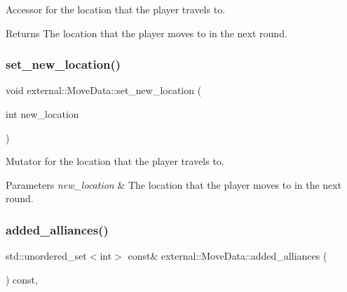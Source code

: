 Accessor for the location that the player travels to. 

\begin{DoxyReturn}{Returns}
The location that the player moves to in the next round. 
\end{DoxyReturn}
\mbox{\label{classexternal_1_1_move_data_a81e78c6507a8cb0be615b23e9c94b7f4}} 
\subsubsection{\texorpdfstring{set\+\_\+new\+\_\+location()}{set\_new\_location()}}
{\footnotesize\ttfamily void external\+::\+Move\+Data\+::set\+\_\+new\+\_\+location (\begin{DoxyParamCaption}\item[{int}]{new\+\_\+location }\end{DoxyParamCaption})\hspace{0.3cm}{\ttfamily [inline]}}



Mutator for the location that the player travels to. 


\begin{DoxyParams}{Parameters}
{\em new\+\_\+location} & The location that the player moves to in the next round. \\
\hline
\end{DoxyParams}
\mbox{\label{classexternal_1_1_move_data_a0bcb09d49ed392fb21395d6182d63f26}} 
\subsubsection{\texorpdfstring{added\+\_\+alliances()}{added\_alliances()}}
{\footnotesize\ttfamily std\+::unordered\+\_\+set$<$int$>$ const\& external\+::\+Move\+Data\+::added\+\_\+alliances (\begin{DoxyParamCaption}{ }\end{DoxyParamCaption}) const\hspace{0.3cm}{\ttfamily [inline]}, {\ttfamily [noexcept]}}



